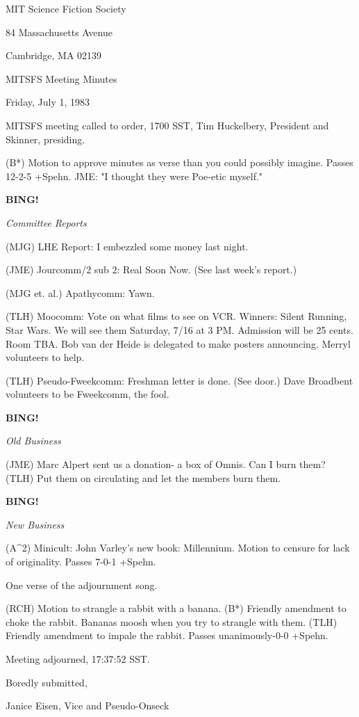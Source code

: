 \documentclass[12pt]{article}
\newcommand{\bing}{{\bf BING!} }
\newcommand{\goto}[1]{\bing \vskip 12pt \centerline{{\em{#1}}}}
\begin{document}
\begin{center}

MIT Science Fiction Society 

84 Massachusetts Avenue

Cambridge, MA 02139

\vspace{12pt}

MITSFS Meeting Minutes 

Friday, July 1, 1983

\end{center}
 
\vspace{18pt}

\setlength{\parskip}{6pt}

\noindent
MITSFS meeting called to order, 1700 SST,
Tim Huckelbery, President and Skinner, presiding.

(B*) Motion to approve minutes as verse than you could possibly imagine. Passes 12-2-5 +Spehn. JME: "I thought they were Poe-etic myself."

\goto{Committee Reports}

(MJG) LHE Report: I embezzled some money last night.

(JME) Jourcomm/2 sub 2: Real Soon Now. (See last week's report.)

(MJG et. al.) Apathycomm: Yawn.

(TLH) Moocomm: Vote on what films to see on VCR. Winners: Silent Running, Star Wars. We will see them Saturday, 7/16 at 3 PM. Admission will be 25 cents. Room TBA. Bob van der Heide is delegated to make posters announcing. Merryl volunteers to help.

(TLH) Pseudo-Fweekcomm: Freshman letter is done. (See door.) Dave Broadbent volunteers to be Fweekcomm, the fool.

\goto{Old Business}

(JME) Marc Alpert sent us a donation- a box of Omnis. Can I burn them? (TLH) Put them on circulating and let the members burn them.

\goto{New Business}

(A^2) Minicult: John Varley's new book: Millennium. Motion to censure for lack of originality. Passes 7-0-1 +Spehn.

One verse of the adjournment song.

(RCH) Motion to strangle a rabbit with a banana. (B*) Friendly amendment to choke the rabbit. Bananas moosh when you try to strangle with them. (TLH) Friendly amendment to impale the rabbit. Passes unanimously-0-0 +Spehn.

\vspace{12pt}

\noindent
Meeting adjourned, 17:37:52 SST.

\vspace{18pt}

\centerline{Boredly submitted,}
\centerline{Janice Eisen, Vice and Pseudo-Onseck}
\end{document}
